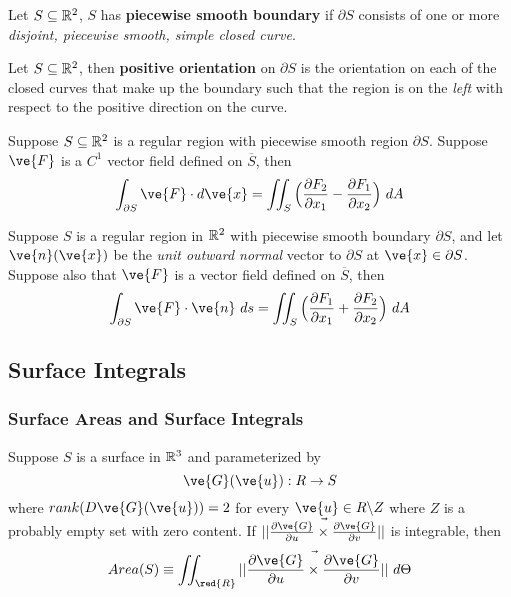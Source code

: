 \documentclass[11pt]{article}
\begin{document}
				\begin{definition}
					Let $S \subseteq \mathbb{R}^2$, $S$ has \textbf{piecewise smooth boundary} if $\partial S$ consists of one or more \emph{disjoint, piecewise smooth, simple closed curve}.
				\end{definition}
				
				\begin{definition}
					Let $S \subseteq \mathbb{R}^2$, then \textbf{positive orientation} on $\partial S$ is the orientation on each of the closed curves that make up the boundary such that the region is on the \emph{left} with respect to the positive direction on the curve.
				\end{definition}
				
				\begin{theorem}
					Suppose $S \subseteq \mathbb{R}^2$ is a regular region with piecewise smooth region $\partial S$. Suppose $\ve{F}$ is a $C^1$ vector field defined on $\overline{S}$, then
					\begin{equation}
						\int_{\partial S} \ve{F}\cdot d\ve{x} = \iint_S \Big(\pd{F_2}{x_1} - \pd{F_1}{x_2}\Big)\ dA
					\end{equation}
				\end{theorem}
				
				\begin{corollary}
					Suppose $S$ is a regular region in $\mathbb{R}^2$ with piecewise smooth boundary $\partial S$, and let $\ve{n}(\ve{x})$ be the \emph{unit outward normal} vector to $\partial S$ at $\ve{x} \in \partial S$. Suppose also that $\ve{F}$ is a vector field defined on $\overline{S}$, then
					\begin{equation}
						\int_{\partial S} \ve{F} \cdot \ve{n}\ ds = \iint_S \Big(\pd{F_1}{x_1}  + \pd{F_2}{x_2}\Big)\ dA
					\end{equation}
%							
				\end{corollary}
		\subsection{Surface Integrals}
			\subsubsection{Surface Areas and Surface Integrals}
				\begin{definition}
					Suppose $S$ is a surface in $\mathbb{R}^3$ and parameterized by
					\begin{equation}
						\ve{G}(\ve{u}): R \to S
					\end{equation}
					where $rank(D\ve{G}(\ve{u}))=2$ for every $\ve{u} \in R \backslash Z$ where $Z$ is a probably empty set with zero content. If $\norm{\pd{\ve{G}}{u} \times \pd{\ve{G}}{v}}$ is integrable, then
					\begin{equation}
						Area(S) \equiv \iint_{\red{R}} \norm{\pd{\ve{G}}{u} \times \pd{\ve{G}}{v}}\ d\Theta
					\end{equation}
				\end{definition}
				
\end{document}
